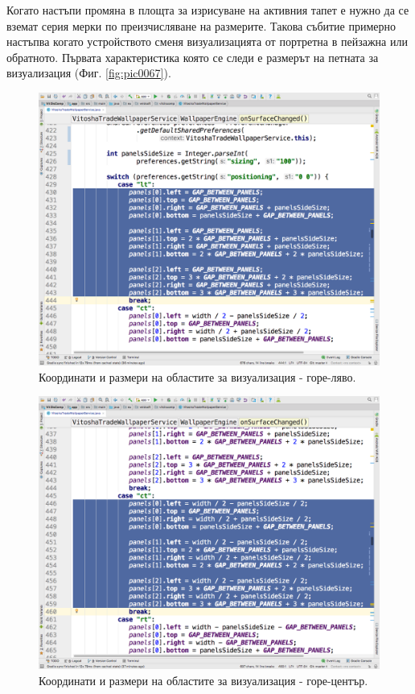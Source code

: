 \documentclass[book,14pt,oneside,openany]{memoir}
\begin{document}
Когато настъпи промяна в площта за изрисуване на активния тапет е нужно да се вземат серия мерки по преизчисляване на размерите. Такова събитие примерно настъпва когато устройството сменя визуализацията от портретна в пейзажна или обратното. Първата характеристика която се следи е размерът на петната за визуализация (Фиг. \ref{fig:pic0067}).


\begin{figure}[h]
  \centering
  \includegraphics[height=0.45\pdfpageheight]{pic0068}
  \caption{Координати и размери на областите за визуализация - горе-ляво.}
\label{fig:pic0068}
\end{figure}
\FloatBarrier

\begin{figure}[h]
  \centering
  \includegraphics[height=0.45\pdfpageheight]{pic0069}
  \caption{Координати и размери на областите за визуализация - горе-център.}
\label{fig:pic0069}
\end{figure}
\FloatBarrier
\end{document}
